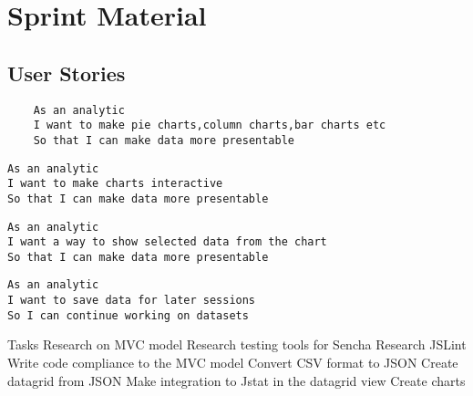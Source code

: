 \section{Sprint Material} %
\label{sec:Sprint Material}
\subsection{User Stories} 
\begin{verbatim}
	As an analytic
	I want to make pie charts,column charts,bar charts etc
	So that I can make data more presentable
\end{verbatim}
\begin{verbatim}
As an analytic
I want to make charts interactive 
So that I can make data more presentable
\end{verbatim}
\begin{verbatim}
As an analytic
I want a way to show selected data from the chart
So that I can make data more presentable
\end{verbatim}
\begin{verbatim}
As an analytic
I want to save data for later sessions
So I can continue working on datasets
\end{verbatim}
 

Tasks
Research on MVC model
Research testing tools for Sencha
Research JSLint
Write code compliance  to the MVC model
Convert CSV format to JSON
Create datagrid from JSON
Make integration to Jstat in the datagrid view
Create charts

